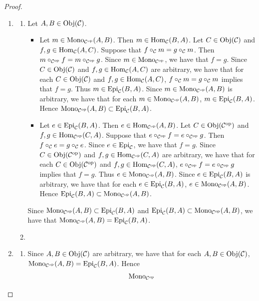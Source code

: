 \documentclass{book}
\begin{document}
	\begin{proof}\
		\begin{enumerate}
			\item 
			\begin{enumerate}
				\item Let $A,B \in \Obj(\MC)$.
				\begin{itemize}
					\item Let $m \in \Mono_{\op{\MC}}(A,B)$. Then $m \in \Hom_{\MC}(B,A)$. Let $C \in \Obj(\MC)$ and $f,g \in \Hom_{\MC}(A, C)$. Suppose that $f \circ_{\MC} m = g \circ_{\MC} m$. Then $m \circ_{\op{\MC}} f = m \circ_{\op{\MC}} g$. Since $m \in \Mono_{\op{\MC}}$, we have that $f = g$. Since $C \in \Obj(\MC)$ and $f,g \in \Hom_{\MC}(A, C)$ are arbitrary, we have that for each $C \in \Obj(\MC)$ and $f,g \in \Hom_{\MC}(A, C)$, $f \circ_{\MC} m = g \circ_{\MC} m$ implies that $f = g$. Thus $m \in \Epi_{\MC}(B,A)$. Since $m \in \Mono_{\op{\MC}}(A,B)$ is arbitrary, we have that for each $m \in \Mono_{\op{\MC}}(A,B)$, $m \in \Epi_{\MC}(B,A)$. Hence $\Mono_{\op{\MC}}(A,B) \subset \Epi_{\MC}(B,A)$. 
					\item Let $e \in \Epi_{\MC}(B,A)$. Then $e \in \Hom_{\op{\MC}}(A,B)$. Let $C \in \Obj(\op{\MC})$ and $f,g \in \Hom_{\op{\MC}}(C, A)$. Suppose that $e \circ_{\op{\MC}} f = e \circ_{\op{\MC}} g$. Then $f \circ_{\MC} e = g \circ_{\MC} e$. Since $e \in \Epi_{\MC}$, we have that $f = g$. Since $C \in \Obj(\op{\MC})$ and $f,g \in \Hom_{\op{\MC}}(C, A)$ are arbitrary, we have that for each $C \in \Obj(\op{\MC})$ and $f,g \in \Hom_{\op{\MC}}(C, A)$, $e \circ_{\op{\MC}} f = e \circ_{\op{\MC}} g$ implies that $f = g$. Thus $e \in \Mono_{\op{\MC}}(A, B)$. Since $e \in \Epi_{\MC}(B,A)$ is arbitrary, we have that for each $e \in \Epi_{\MC}(B,A)$, $e \in \Mono_{\op{\MC}}(A, B)$. Hence $\Epi_{\MC}(B,A) \subset \Mono_{\op{\MC}}(A,B)$. 
				\end{itemize}
				Since $\Mono_{\op{\MC}}(A,B) \subset \Epi_{\MC}(B,A)$ and $\Epi_{\MC}(B,A) \subset \Mono_{\op{\MC}}(A,B)$, we have that $\Mono_{\op{\MC}}(A,B) = \Epi_{\MC}(B,A)$. 
				\item 
			\end{enumerate}
			\item 
			\begin{enumerate}
				\item 
				Since $A,B \in \Obj(\MC)$ are arbitrary, we have that for each $A,B \in \Obj(\MC)$, $\Mono_{\op{\MC}}(A,B) = \Epi_{\MC}(B,A)$. Hence 
				\begin{align*}
					\Mono_{\op{\MC}}

\end{align*}
\end{enumerate}
\end{enumerate}
\end{proof}
\end{document}

